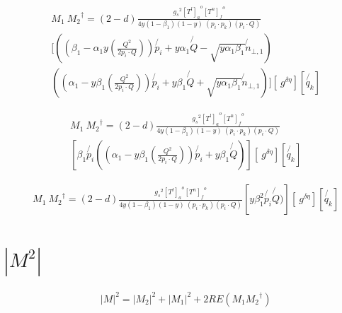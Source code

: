 \begin{equation}
\begin{split}
&M_1\: {M_2}^{\dagger}=(2-d)\frac{{g_s}^2 {[T^l]_a}^o {[T^n]_{f}}^{o}}{4y(1-\beta_1) (1-y)\:(p_i \cdot p_k)(p_i \cdot Q) }\\
&[((\beta_1 -\alpha_1 y(\frac{Q^2}{2p_i \cdot Q}))\not{p_i} + y\alpha_1\not{Q} - \sqrt{y\alpha_1\beta_1}\not{n}_{\bot,1})\\&((\alpha_1 -y\beta_1(\frac{Q^2}{2p_i \cdot Q})) \not{p_i} + y\beta_1\not{Q} + \sqrt{y\alpha_1\beta_1}\not{n}_{\bot,1})][\: g^{\delta \eta}][\not{q_k}]
\end{split}
\end{equation}

\begin{equation}
\begin{split}
&M_1\: {M_2}^{\dagger}=(2-d)\frac{{g_s}^2 {[T^l]_a}^o {[T^n]_{f}}^{o}}{4y(1-\beta_1) (1-y)\:(p_i \cdot p_k)(p_i \cdot Q) }\\
&[\beta_1 \not{p_i}((\alpha_1 -y\beta_1(\frac{Q^2}{2p_i \cdot Q})) \not{p_i} + y\beta_1\not{Q}) ][\: g^{\delta \eta}][\not{q_k}]
\end{split}
\end{equation}

\begin{equation}
\begin{split}
&M_1\: {M_2}^{\dagger}=(2-d)\frac{{g_s}^2 {[T^l]_a}^o {[T^n]_{f}}^{o}}{4y(1-\beta_1) (1-y)\:(p_i \cdot p_k)(p_i \cdot Q) }[y\beta_1^2 \not{p_i}\not{Q}) ][\: g^{\delta \eta}][\not{q_k}]
\end{split}
\end{equation}

\section{$|M^{2}|$}

\begin{equation}
\begin{split}
&|M|^{2}=|{M}_2|^{2}+|{M}_1|^{2}+2RE(M_1{M_2}^{\dagger})\\
\end{split}
\end{equation}